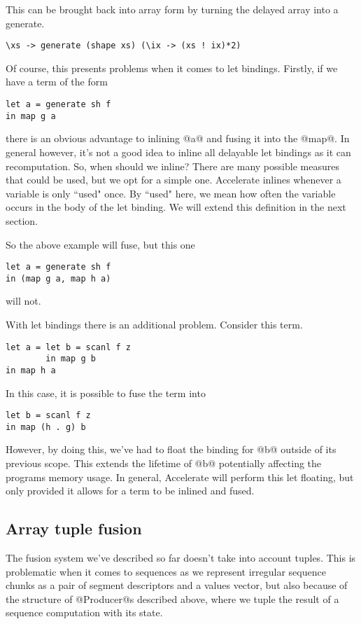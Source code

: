 This can be brought back into array form by turning the delayed array into a generate.
%
\begin{lstlisting}
\xs -> generate (shape xs) (\ix -> (xs ! ix)*2)
\end{lstlisting}
%
Of course, this presents problems when it comes to let bindings. Firstly, if we have a term of the form
%
\begin{lstlisting}
let a = generate sh f
in map g a
\end{lstlisting}
%
there is an obvious advantage to inlining @a@ and fusing it into the @map@. In general however, it's not a good idea to inline all delayable let bindings as it can recomputation. So, when should we inline? There are many possible measures that could be used, but we opt for a simple one. Accelerate inlines whenever a variable is only ``used" once. By ``used" here, we mean how often the variable occurs in the body of the let binding. We will extend this definition in the next section.

So the above example will fuse, but this one
%
\begin{lstlisting}
let a = generate sh f
in (map g a, map h a)
\end{lstlisting}
%
will not.

With let bindings there is an additional problem. Consider this term.
%
\begin{lstlisting}
let a = let b = scanl f z
        in map g b
in map h a
\end{lstlisting}
%
In this case, it is possible to fuse the term into
%
\begin{lstlisting}
let b = scanl f z
in map (h . g) b
\end{lstlisting}
%
However, by doing this, we've had to float the binding for @b@ outside of its previous scope. This extends the lifetime of @b@ potentially affecting the programs memory usage. In general, Accelerate will perform this let floating, but only provided it allows for a term to be inlined and fused.

\subsection{Array tuple fusion}

The fusion system we've described so far doesn't take into account tuples. This is problematic when it comes to sequences as we represent irregular sequence chunks as a pair of segment descriptors and a values vector, but also because of the structure of @Producer@s described above, where we tuple the result of a sequence computation with its state.

